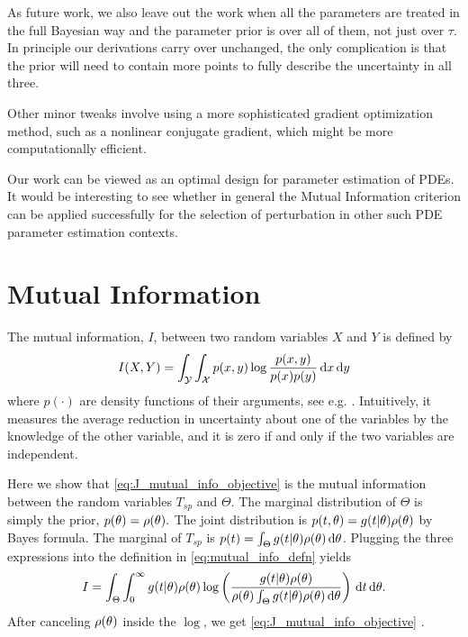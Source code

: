 \documentclass{article}
\begin{document}
As future work, we also leave out the work when all the parameters are treated
in the full Bayesian way and the parameter prior is over all of them, not just
over $\tau$. In principle our derivations carry over unchanged,
the only complication is that the prior will need to contain more points to fully
describe the uncertainty in all three. 

Other minor tweaks involve using a more sophisticated gradient optimization
method, such as a nonlinear conjugate gradient, which might be more
computationally efficient. 

Our work can be viewed as an optimal design for 
parameter estimation of PDEs. It would be interesting to see whether in general
the Mutual Information criterion can be applied successfully for the selection of
perturbation in other such PDE parameter estimation contexts. 

\clearpage
\appendix
\section{Mutual Information}
\label{sec:mutual_info_defn} 
The mutual information, $I$, between two random
variables $X$ and $Y$ is defined by
\begin{equation} 
I(X,Y) = \int_{\mathcal{Y}} \int_{\mathcal{X}} p(x,y) \log \frac{p(x,y)}{p(x)p(y)} \, \mathrm{d} x\, \mathrm{d} y
\label{eq:mutual_info_defn}
\end{equation}
where $p(\cdot)$ are density functions of their arguments, 
see e.g. \cite{MacKay2003,Cover2006}. Intuitively, it measures the
average reduction in uncertainty about one of the variables by the
knowledge of the other variable, and it is zero if and only if the two
variables are independent.

Here we show that \cref{eq:J_mutual_info_objective} is the mutual
information between the random variables $T_{sp}$ and $\Theta$.  
The marginal distribution of $\Theta$ is simply the prior, $p({\theta}) =
\rho({\theta}).$ The joint distribution is $p(t,{\theta}) = 
g(t|{\theta})\rho({\theta})$ by Bayes formula. The marginal of $T_{sp}$ is $p(t) =
\int_\Theta g(t|{\theta})\rho({\theta}) \, \mathrm{d} {\theta}$. 
Plugging the three expressions into the definition in
\cref{eq:mutual_info_defn} yields
\begin{equation}
I = \int_\Theta \int_0^{\infty} g(t|{\theta})\rho({\theta}) 
\log \left( \frac{g(t|{\theta})\rho({\theta}) }{\rho({\theta})\int_\Theta g(t|{\theta})\rho({\theta}) \, \mathrm{d} {\theta}
 } \right)
\, \mathrm{d} t\, \mathrm{d} {\theta}.
\label{eq:mutual_info_prior_trajectory}
\end{equation}
After canceling $\rho({\theta})$ inside the $\log$, we get
\cref{eq:J_mutual_info_objective} .
\end{document}
